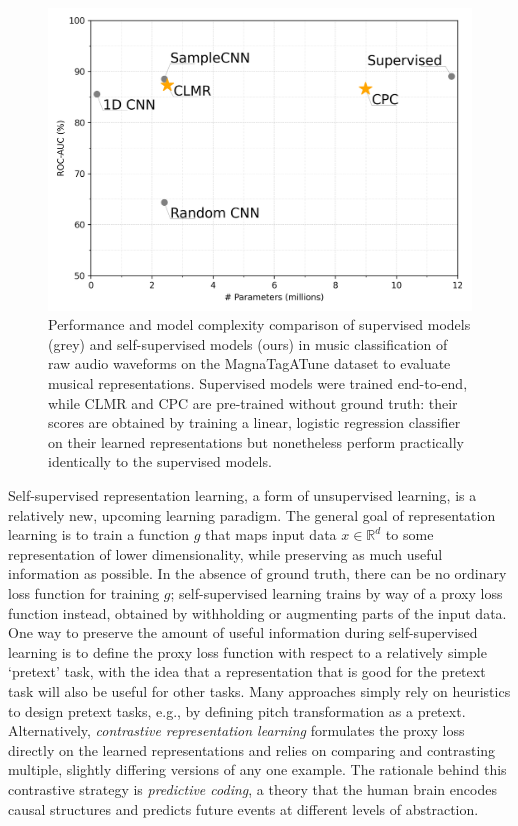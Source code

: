 \documentclass{report}
\begin{document}
\begin{figure}[t]
    \centering
    \includegraphics[width=.5\columnwidth]{figs/performance.png}
    \caption{Performance and model complexity comparison of supervised models (grey) and self-supervised models (ours) in music classification of raw audio waveforms on the MagnaTagATune dataset to evaluate musical representations. Supervised models were trained end-to-end, while CLMR and CPC are pre-trained without ground truth: their scores are obtained by training a linear, logistic regression classifier on their learned representations but nonetheless perform practically identically to the supervised models.}
    \label{fig:example}
\end{figure}

Self-supervised representation learning, a form of unsupervised learning, is a relatively new, upcoming learning paradigm\cite{dosovitskiy2015discriminative, oord_representation_2019, hjelm_learning_2019,chen_simple_2020}.
The general goal of representation learning is to train a function $g$ that maps input data $x \in \mathbb{R}^d$ to some representation of lower dimensionality, while preserving as much useful information as possible. In the absence of ground truth, there can be no ordinary loss function for training $g$; self-supervised learning trains by way of a proxy loss function instead, obtained by withholding or augmenting parts of the input data. One way to preserve the amount of useful information during self-supervised learning is to define the proxy loss function with respect to a relatively simple `pretext' task, with the idea that a representation that is good for the pretext task will also be useful for other tasks. Many approaches simply rely on heuristics to design pretext tasks\cite{doersch_unsupervised_2015,zhang2016colorful}, e.g., by defining pitch transformation as a pretext\cite{spice}. Alternatively, \emph{contrastive representation learning} formulates the proxy loss directly on the learned representations and relies on comparing and contrasting multiple, slightly differing versions of any one example. The rationale behind this contrastive strategy is \emph{predictive coding}, a theory that the human brain encodes causal structures and predicts future events at different levels of abstraction\cite{friston_predictive_2009}.
\end{document}
